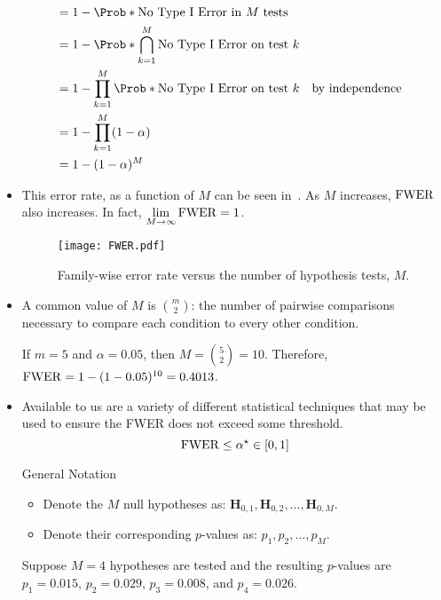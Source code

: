 \begin{itemize}
\begin{align*}
                   & =1-\Prob*{\text{No Type I Error in $ M $ tests}}                                           \\
                   & =1-\Prob*{\bigcap_{k=1}^M\text{No Type I Error on test $ k $}}                             \\
                   & =1-\prod_{k=1}^M\Prob*{\text{No Type I Error on test $ k $}}   &  & \text{by independence} \\
                   & =1-\prod_{k=1}^M(1-\alpha)                                                                 \\
                   & =1-(1-\alpha)^M
            \end{align*}
      \item This error rate, as a function of $M$ can be seen in~. As $ M $ increases, $ \operatorname{FWER} $ also increases.
            In fact, $ \lim\limits_{{M} \to {\infty}} \operatorname{FWER}=1 $.
            \begin{figure}[!htbp]
                  \centering
                  \texttt{[image: FWER.pdf]}
                  \caption{Family-wise error rate versus the number of hypothesis tests, $M$.}\label{fig:FWER}
            \end{figure}
      \item A common value of $ M $ is $ \binom{m}{2} $: the number of pairwise comparisons necessary to compare each condition
            to every other condition.
            \begin{Example}{}{}
                  If $ m=5 $ and $ \alpha=0.05 $, then $ M=\binom{5}{2}=10 $. Therefore, $ \operatorname{FWER}=1-(1-0.05)^{10}=0.4013 $.
            \end{Example}
      \item Available to us are a variety of different statistical techniques that may be used to ensure the FWER
            does not exceed some threshold.
            \[ \operatorname{FWER}\le \alpha^\star \in[0,1] \]
            \begin{Remark}{General Notation}{}
                  \begin{itemize}
                        \item Denote the $ M $ null hypotheses as: $ \mathbf{H}_{0,1},\mathbf{H}_{0,2},\ldots,\mathbf{H}_{0,M} $.
                        \item Denote their corresponding $ p $-values as: $ p_1,p_2,\ldots,p_M $.
                  \end{itemize}
            \end{Remark}
            \begin{Example}{}{}
                  Suppose $ M =4 $ hypotheses are tested and the resulting $ p $-values are $ p_1 =0.015$, $ p_2=0.029 $,
                  $ p_3=0.008 $, and $ p_4=0.026 $.
            \end{Example}
\end{itemize}
